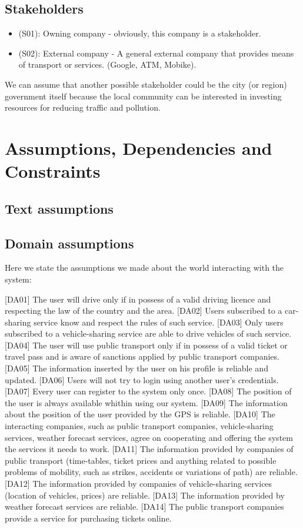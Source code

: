 \documentclass[a4paper,leqno]{book}
\begin{document}
\subsection{Stakeholders}
\begin{itemize}

\item (S01): Owning company - obviously, this company is a stakeholder.
\item (S02): External company - A general external company that provides means of transport or services. (Google, ATM, Mobike).

\end{itemize}

We can assume that another possible stakeholder could be the city (or region) government itself because the local community can be interested in investing resources for reducing traffic and pollution.\\

\section{Assumptions, Dependencies and Constraints}
\subsection{Text assumptions}

\subsection{Domain assumptions}
Here we state the assumptions we made about the world interacting with the system:

[DA01] The user will drive only if in possess of a valid driving licence and respecting the law of the country and the area.
[DA02] Users subscribed to a car-sharing service know and respect the rules of such service.
[DA03] Only users subscribed to a vehicle-sharing service are able to drive vehicles of such service.
[DA04] The user will use public transport only if in possess of a valid ticket or travel pass and is aware of sanctions applied by public transport companies.
[DA05] The information inserted by the user on his profile is reliable and updated.
[DA06] Users will not try to login using another user's credentials.
[DA07] Every user can register to the system only once.
[DA08] The position of the user is always available whithin using our system.
[DA09] The information about the position of the user provided by the GPS is reliable.
[DA10] The interacting companies, such as public transport companies, vehicle-sharing services, weather forecast services, agree on cooperating and offering the system the services it needs to work.
[DA11] The information provided by companies of public transport (time-tables, ticket prices and anything related to possible problems of mobility, such as strikes, accidents or variations of path) are reliable.
[DA12] The information provided by companies of vehicle-sharing services (location of vehicles, prices) are reliable.
[DA13] The information provided by weather forecast services are reliable.
[DA14] The public transport companies provide a service for purchasing tickets online.
\end{document}
